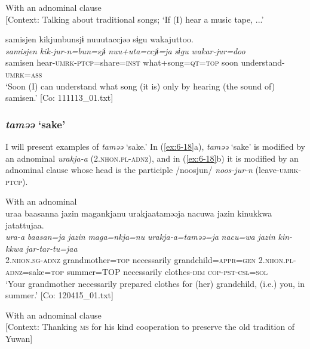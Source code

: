 \ex With an adnominal clause\\{}
[Context: Talking about traditional songs; {\TM} ‘If (I) hear a music tape, ...’

{\TM}
\glll samisjen  kikjunbunsjɨ  nuuutaccjəə     sɨgu  wakajuttoo.\\
      \textit{samisjen}  \textit{kik-jur-n=bun=sjɨ}  \textit{nuu+uta=ccjɨ=ja} \textit{sɨgu}  \textit{wakar-jur=doo}\\
      samisen  hear-\textsc{umrk}-\textsc{ptcp}=share=\textsc{inst}  what+song=\textsc{qt}=\textsc{top}      soon  understand-\textsc{umrk}=\textsc{ass}\\
\glt ‘Soon (I) can understand what song (it is) only by hearing (the sound of) samisen.’ [Co: 111113\_01.txt]
\z
\z

\subsubsection{\textit{taməə} ‘sake’}

I will present examples of \textit{taməə} ‘sake.’ In (\ref{ex:6-18}a), \textit{taməə} ‘sake’ is modified by an adnominal \textit{urakja-a} (2.\textsc{nhon}.\textsc{pl}-\textsc{adnz}), and in (\ref{ex:6-18}b) it is modified by an adnominal clause whose head is the participle /noosjun/ \textit{noos-jur-n} (leave-\textsc{umrk}-\textsc{ptcp}).

\ea\label{ex:6-18}
\ea With an adnominal\\
{\TM}
\glll  uraa  baasanna  jazin  magankjanu  urakjaataməəja  {\textbar}nacuwa{\textbar}  jazin      kinukkwa  jatattujaa.\\
\textit{ura-a}  \textit{baasan=ja}  \textit{jazin}  \textit{maga=nkja=nu}     \textit{urakja-a=taməə=ja}  \textit{nacu=wa}  \textit{jazin}     \textit{kin-kkwa}  \textit{jar-tar-tu=jaa} \\
2.\textsc{nhon}.\textsc{sg}-\textsc{adnz}  grandmother=\textsc{top}  necessarily  grandchild=\textsc{appr}=\textsc{gen}   2.\textsc{nhon}.\textsc{pl}-\textsc{adnz}=sake=\textsc{top}  summer=TOP  necessarily clothes-\textsc{dim}  \textsc{cop}-\textsc{pst}-\textsc{csl}=\textsc{sol}\\
\glt ‘Your grandmother necessarily prepared clothes for (her) grandchild, (i.e.) you, in summer.’ [Co: 120415\_01.txt]
\z

\ex With an adnominal clause\\{}
[Context: Thanking \textsc{ms} for his kind cooperation to preserve the old tradition of Yuwan]

